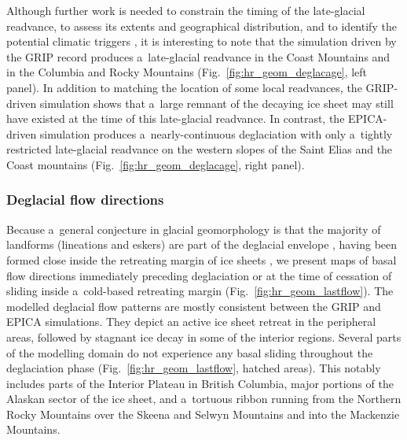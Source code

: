 \documentclass[tc, manuscript]{copernicus}
\begin{document}
      Although further work is needed to constrain the timing of the
      late-glacial readvance, to assess its extents and geographical
      distribution, and to identify the potential climatic triggers
      \citep{Menounos.etal.2008}, it is interesting to note that the
      simulation driven by the GRIP record produces a~late-glacial readvance
      in the Coast Mountains and in the Columbia and Rocky Mountains
      (Fig.~\ref{fig:hr_geom_deglacage}, left panel). In addition to
      matching the location of some local readvances, the GRIP-driven
      simulation shows that a~large remnant of the decaying ice sheet may
      still have existed at the time of this late-glacial readvance. In
      contrast, the EPICA-driven simulation produces a~nearly-continuous
      deglaciation with only a~tightly restricted late-glacial readvance on
      the western slopes of the Saint Elias and the Coast mountains
      (Fig.~\ref{fig:hr_geom_deglacage}, right panel).


\subsubsection{Deglacial flow directions}

      Because a~general conjecture in glacial geomorphology is that the majority
      of landforms (lineations and eskers) are part of the deglacial
      envelope \citep[terminology from][]{Kleman.etal.2006}, having been
      formed close inside the retreating margin of ice sheets
      \citep{Boulton.Clark.1990, Kleman.etal.1997, Kleman.etal.2010}, we
      present maps of basal flow directions immediately preceding
      deglaciation or at the time of cessation of sliding inside
      a~cold-based retreating margin (Fig.~\ref{fig:hr_geom_lastflow}). The
      modelled deglacial flow patterns are mostly consistent between the
      GRIP and EPICA simulations. They depict an active ice sheet retreat in
      the peripheral areas, followed by stagnant ice decay in some of the
      interior regions. Several parts of the modelling domain do not
      experience any basal sliding throughout the deglaciation phase
      (Fig.~\ref{fig:hr_geom_lastflow}, hatched areas). This notably
      includes parts of the Interior Plateau in British Columbia, major
      portions of the Alaskan sector of the ice sheet, and a~tortuous ribbon
      running from the Northern Rocky Mountains over the Skeena and Selwyn
      Mountains and into the Mackenzie Mountains.
\end{document}
